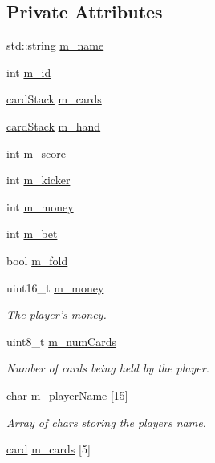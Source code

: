 \subsection*{Private Attributes}
\begin{DoxyCompactItemize}
\item 
std\-::string \hyperlink{classplayer_a628377063791d7bae76e87e4d8f9aa40}{m\-\_\-name}
\item 
int \hyperlink{classplayer_af39fefbc41390382877705aafe663e07}{m\-\_\-id}
\item 
\hyperlink{classcardStack}{card\-Stack} \hyperlink{classplayer_ab37cde9b3129e88e933d58378625ff15}{m\-\_\-cards}
\item 
\hyperlink{classcardStack}{card\-Stack} \hyperlink{classplayer_aa8dd9538f53046d07516e3a7cd12bca5}{m\-\_\-hand}
\item 
int \hyperlink{classplayer_a9f5cd35f681112a6d9dde60c4c2e3104}{m\-\_\-score}
\item 
int \hyperlink{classplayer_a8d94f5187090d4a2c9736f2c5a7fd6f8}{m\-\_\-kicker}
\item 
int \hyperlink{classplayer_acc48e66234bb330f9db34ca6dc91479b}{m\-\_\-money}
\item 
int \hyperlink{classplayer_acf065485c206c03823772ab5cb52aadc}{m\-\_\-bet}
\item 
bool \hyperlink{classplayer_af63e49f7ff0294e1b2afa1431e3bb9f6}{m\-\_\-fold}
\item 
uint16\-\_\-t \hyperlink{classplayer_a4581e0079269f9b01515df03c2619e53}{m\-\_\-money}
\begin{DoxyCompactList}\small\item\em The player's money. \end{DoxyCompactList}\item 
uint8\-\_\-t \hyperlink{classplayer_ab56ae76ad0ac3d440d3afcdceec6e72f}{m\-\_\-num\-Cards}
\begin{DoxyCompactList}\small\item\em Number of cards being held by the player. \end{DoxyCompactList}\item 
char \hyperlink{classplayer_abfcf5c8912c0d6dc30c534fb835d551d}{m\-\_\-player\-Name} \mbox{[}15\mbox{]}
\begin{DoxyCompactList}\small\item\em Array of chars storing the players name. \end{DoxyCompactList}\item 
\hyperlink{structcard}{card} \hyperlink{classplayer_a05fe561ee0d66a696d766bd08f1daae9}{m\-\_\-cards} \mbox{[}5\mbox{]}

\end{DoxyCompactItemize}
